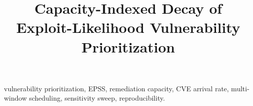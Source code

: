 \documentclass[journal]{IEEEtran}
\title{Capacity-Indexed Decay of Exploit-Likelihood
Vulnerability Prioritization}
\author{%
  \IEEEauthorblockN{Harshavardhan Malla}
  \IEEEauthorblockA{Independent Researcher}%
}
\begin{document}
\maketitle

\begin{abstract}

\end{abstract}

\begin{IEEEkeywords}
vulnerability prioritization, EPSS, remediation capacity, CVE arrival rate,
multi-window scheduling, sensitivity sweep, reproducibility.
\end{IEEEkeywords}













\end{document}
